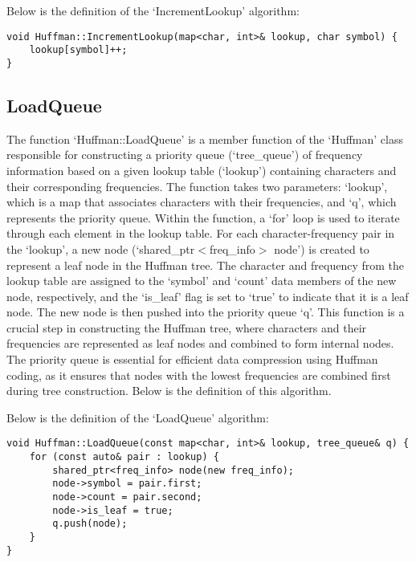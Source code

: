 \begin{highlight}
    
Below is the definition of the `IncrementLookup' algorithm:

\horizontalline

\begin{verbatim}
void Huffman::IncrementLookup(map<char, int>& lookup, char symbol) {
    lookup[symbol]++;
}
\end{verbatim}

\end{highlight}

\subsection*{LoadQueue}

The function `Huffman::LoadQueue' is a member function of the `Huffman' class responsible for constructing a priority queue (`tree\_queue') of frequency information based on a given lookup table (`lookup') 
containing characters and their corresponding frequencies. The function takes two parameters: `lookup', which is a map that associates characters with their frequencies, and `q', which represents the priority 
queue. Within the function, a `for' loop is used to iterate through each element in the lookup table. For each character-frequency pair in the `lookup', a new node (`shared\_ptr$<$freq\_info$>$ node') is created 
to represent a leaf node in the Huffman tree. The character and frequency from the lookup table are assigned to the `symbol' and `count' data members of the new node, respectively, and the `is\_leaf' flag is set 
to `true' to indicate that it is a leaf node. The new node is then pushed into the priority queue `q'. This function is a crucial step in constructing the Huffman tree, where characters and their frequencies are 
represented as leaf nodes and combined to form internal nodes. The priority queue is essential for efficient data compression using Huffman coding, as it ensures that nodes with the lowest frequencies are combined 
first during tree construction. Below is the definition of this algorithm.

\begin{highlight}

Below is the definition of the `LoadQueue' algorithm:
    
\horizontalline
    
\begin{verbatim}
void Huffman::LoadQueue(const map<char, int>& lookup, tree_queue& q) {
    for (const auto& pair : lookup) {
        shared_ptr<freq_info> node(new freq_info);
        node->symbol = pair.first;
        node->count = pair.second;
        node->is_leaf = true;
        q.push(node);
    }
}
\end{verbatim}

\end{highlight}

